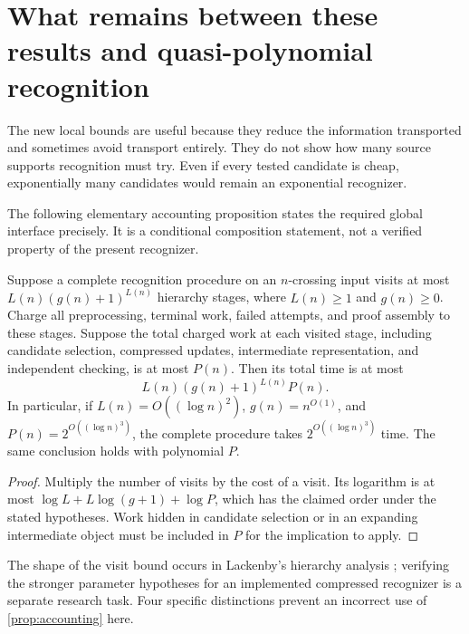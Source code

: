 \section{What remains between these results and quasi-polynomial recognition}
\label{sec:global}

The new local bounds are useful because they reduce the information transported
and sometimes avoid transport entirely.  They do not show how many source
supports recognition must try.  Even if every tested candidate is cheap,
exponentially many candidates would remain an exponential recognizer.

The following elementary accounting proposition states the required global
interface precisely.  It is a conditional composition statement, not a
verified property of the present recognizer.

\begin{proposition}
\label{prop:accounting}
Suppose a complete recognition procedure on an $n$-crossing input visits at
most $L(n)(g(n)+1)^{L(n)}$ hierarchy stages, where $L(n)\ge1$ and $g(n)\ge0$.
Charge all preprocessing, terminal work, failed attempts, and proof assembly
to these stages.  Suppose the total charged work at each
visited stage, including candidate selection, compressed updates, intermediate
representation, and independent checking, is at most $P(n)$.  Then its total
time is at most
\[
 L(n)(g(n)+1)^{L(n)}P(n).
\]
In particular, if $L(n)=O((\log n)^2)$, $g(n)=n^{O(1)}$, and
$P(n)=2^{O((\log n)^3)}$, the complete procedure takes
$2^{O((\log n)^3)}$ time.  The same conclusion holds with polynomial $P$.
\end{proposition}

\begin{proof}
Multiply the number of visits by the cost of a visit.  Its logarithm is at
most $\log L+L\log(g+1)+\log P$, which has the claimed order under the stated
hypotheses.  Work hidden in candidate selection or in an expanding intermediate
object must be included in $P$ for the implication to apply.
\end{proof}

The shape of the visit bound occurs in Lackenby's hierarchy analysis
\cite[Proposition~9.1]{Lackenby26}; verifying the stronger parameter hypotheses
for an implemented compressed recognizer is a separate research task.  Four
specific distinctions prevent an incorrect use of \cref{prop:accounting} here.


